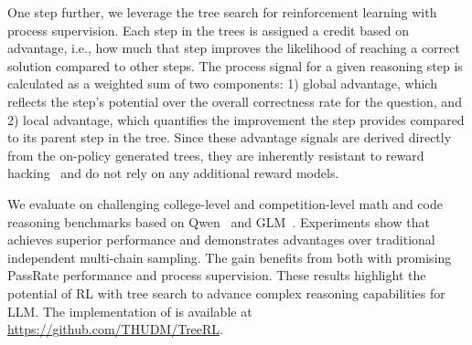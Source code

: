 {One step further, we leverage the tree search for reinforcement learning with process supervision. Each step in the trees is assigned a credit based on advantage, i.e., how much that step improves the likelihood of reaching a correct solution compared to other steps. The process signal for a given reasoning step is calculated as a weighted sum of two components: 1) global advantage, which reflects the step's potential over the overall correctness rate 
for the question, and 2) local advantage, which quantifies the improvement the step provides compared to its parent step in the tree. Since these advantage signals are derived directly from the on-policy generated trees, they are inherently resistant to reward hacking~\citep{skalse2022defining} and do not rely on any additional reward models.



We evaluate \model on challenging college-level and competition-level math and code reasoning benchmarks based on Qwen~\citep{qwen2_5} and GLM~\citep{glm2024chatglm}. Experiments show that \model achieves superior performance and demonstrates advantages over traditional independent multi-chain sampling. The gain benefits from both \treemodel with promising PassRate performance and process supervision. These results highlight the potential of RL with tree search to advance complex reasoning capabilities for LLM. The implementation of \model is available at \url{https://github.com/THUDM/TreeRL}. 

}